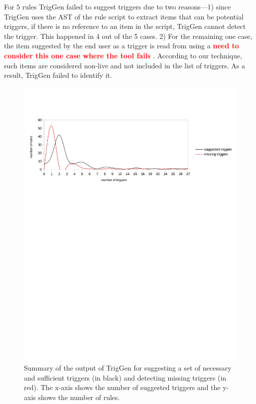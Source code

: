 \documentclass{sig-alternate-05-2015}
\newcommand\todo[1]{\textbf{\textcolor{red}{#1}}}
\begin{document}
For 5 rules TrigGen failed to suggest triggers due to two reasons---1) since TrigGen uses the AST of the rule script to extract items that can be potential triggers, if there is no reference to an item in the script, TrigGen cannot detect the trigger. This happened in 4 out of the 5 cases. 2) For the remaining one case, the item suggested by the end user as a trigger is read from using a \todo{need to consider this one case where the tool fails} . According to our technique, such items are considered non-live and not included in the list of triggers. As a result, TrigGen failed to identify it.

\begin{figure}[t]
\centering
\includegraphics [trim=10 500 50 90, scale=0.7]{images/plot.pdf}
\caption{Summary of the output of TrigGen for suggesting a set of necessary and sufficient triggers (in black) and detecting missing triggers (in red). The x-axis shows the number of suggested triggers and the y-axis shows the number of rules.}
\label{fig:resultgraph}
\end{figure} 
\end{document}
